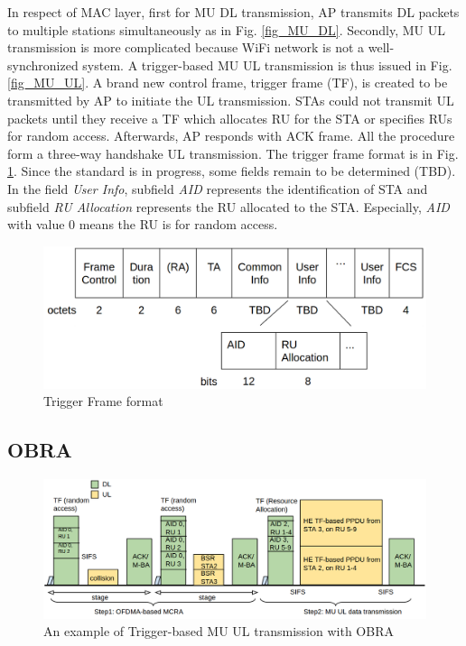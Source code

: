 \documentclass[journal]{IEEEtran}
\begin{document}
In respect of MAC layer, first for MU DL transmission, AP transmits DL packets to multiple stations simultaneously as in Fig. \ref{fig_MU_DL}.
Secondly, MU UL transmission is more complicated because WiFi network is not a well-synchronized system. 
A trigger-based MU UL transmission is thus issued in Fig. \ref{fig_MU_UL}.
A brand new control frame, trigger frame (TF), is created to be transmitted by AP to initiate the UL transmission.
STAs could not transmit UL packets until they receive a TF which allocates RU for the STA or specifies RUs for random access. 
Afterwards, AP responds with ACK frame. All the procedure form a three-way handshake UL transmission. 
The trigger frame format is in Fig. \ref{fig_TF_format}. 
Since the standard is in progress, some fields remain to be determined (TBD). 
In the field \textit{User Info}, subfield \textit{AID} represents the identification of STA and subfield \textit{RU Allocation} represents the RU allocated to the STA.
Especially, \textit{AID} with value 0 means the RU is for random access.


\begin{figure}[!t]
\includegraphics[scale=0.2]{./figure/Section_preliminary/fig_tf_format.png}
\caption{Trigger Frame format}
\label{fig_TF_format}
\end{figure}




\subsection{OBRA}		\label{sec_RA_illu}

\begin{figure}[!ht]
\centering
\includegraphics[scale=0.35]{./figure/Section_preliminary/fig_RA_UL.png}
\caption{An example of Trigger-based MU UL transmission with OBRA}
\label{fig_ra_ul}
\end{figure}
\end{document}
